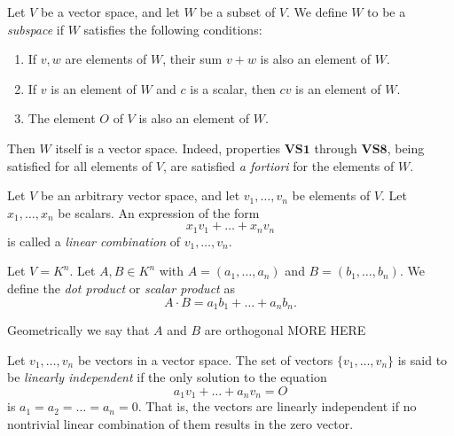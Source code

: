 \documentclass[../main.tex]{subfiles}
\begin{document}
    
    
    \begin{definition}[Subspace]
        Let $V$ be a vector space, and let $W$ be a subset of $V$. We define $W$ to be a \textit{subspace} if $W$ satisfies the following conditions:
    \begin{enumerate}
        \item If $v, w$ are elements of $W$, their sum $v + w$ is also an element of $W$.
        \item If $v$ is an element of $W$ and $c$ is a scalar, then $cv$ is an element of $W$.
        \item The element $O$ of $V$ is also an element of $W$.
    \end{enumerate}
        Then $W$ itself is a vector space. Indeed, properties $\textbf{VS1}$ through $\textbf{VS8}$, being satisfied for all elements of $V$, are satisfied \textit{a fortiori} for the elements of $W$.
    \end{definition}
        
    
    
    
    
    \begin{definition}
        Let $V$ be an arbitrary vector space, and let $v_1, \dots, v_n$ be elements of $V$. Let $x_1, \dots, x_n$ be scalars. An expression of the form
        \[
        x_1 v_1 + \dots + x_n v_n
        \]
        is called a \textit{linear combination} of $v_1, \dots, v_n$.
    \end{definition}
        
    
    \begin{definition}
        Let $V = K^n$. Let $A, B \in K^n$ with $A = (a_1, \dots, a_n)$ and $B = (b_1, \dots, b_n)$. We define the \textit{dot product} or \textit{scalar product} as
        \[
        A \cdot B = a_1 b_1 + \dots + a_n b_n.
        \]
    \end{definition}
        
    \begin{remark}
    Geometrically we say that $A$ and $B$ are orthogonal
    MORE HERE
    \end{remark}
    
    
    
    \begin{definition}
        Let $v_1, \dots, v_n$ be vectors in a vector space. The set of vectors $\{ v_1, \dots, v_n \}$ is said to be \textit{linearly independent} if the only solution to the equation
        \[
        a_1 v_1 + \dots + a_n v_n = O
        \]
        is $a_1 = a_2 = \dots = a_n = 0$. That is, the vectors are linearly independent if no nontrivial linear combination of them results in the zero vector.
    \end{definition}
        
\end{document}
